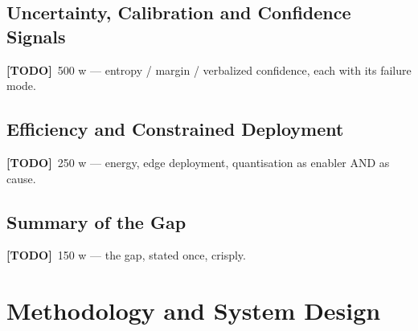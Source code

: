 \documentclass[11pt,a4paper]{report}
\newcommand{\todo}[1]{\par\noindent\textcolor{red!70!black}{\small\textbf{[TODO]}~#1}\par}
\begin{document}
\section{Uncertainty, Calibration and Confidence Signals}
\label{sec:bg-calibration}
\todo{500 w — entropy / margin / verbalized confidence, each with its failure mode.}

\section{Efficiency and Constrained Deployment}
\label{sec:bg-efficiency}
\todo{250 w — energy, edge deployment, quantisation as enabler AND as cause.}

\section{Summary of the Gap}
\label{sec:bg-gap}
\todo{150 w — the gap, stated once, crisply.}

\chapter{Methodology and System Design}
\label{ch:method}
\end{document}
